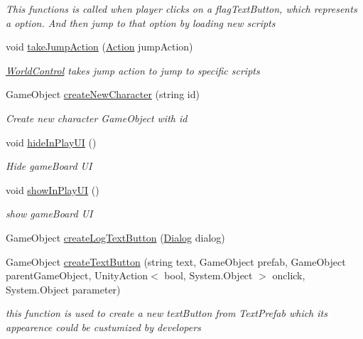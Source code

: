 \begin{DoxyCompactItemize}
\begin{DoxyCompactList}\small\item\em This functions is called when player clicks on a flag\+Text\+Button, which represents a option. And then jump to that option by loading new scripts \end{DoxyCompactList}\item 
void \hyperlink{classdoki_unity_1_1_world_control_aa103f4095742d045e60a608f6c2f7d67}{take\+Jump\+Action} (\hyperlink{classdoki_script_setting_1_1_action}{Action} jump\+Action)
\begin{DoxyCompactList}\small\item\em \hyperlink{classdoki_unity_1_1_world_control}{World\+Control} takes jump action to jump to specific scripts \end{DoxyCompactList}\item 
Game\+Object \hyperlink{classdoki_unity_1_1_world_control_a14311cb9ab401b556dd7f1c5b000b829}{create\+New\+Character} (string id)
\begin{DoxyCompactList}\small\item\em Create new character Game\+Object with id \end{DoxyCompactList}\item 
void \hyperlink{classdoki_unity_1_1_world_control_a4ceab05db8ef564ec44a7beef621e583}{hide\+In\+Play\+UI} ()
\begin{DoxyCompactList}\small\item\em Hide game\+Board UI \end{DoxyCompactList}\item 
void \hyperlink{classdoki_unity_1_1_world_control_ac519c4fe54a706bfdf67a61ceca1be99}{show\+In\+Play\+UI} ()
\begin{DoxyCompactList}\small\item\em show game\+Board UI \end{DoxyCompactList}\item 
Game\+Object \hyperlink{classdoki_unity_1_1_world_control_a5dfd7a49e2aa4559bdfef17e53020b33}{create\+Log\+Text\+Button} (\hyperlink{classdoki_unity_1_1_dialog}{Dialog} dialog)
\item 
Game\+Object \hyperlink{classdoki_unity_1_1_world_control_a3566b054b725be2b66811f4ad1daec26}{create\+Text\+Button} (string text, Game\+Object prefab, Game\+Object parent\+Game\+Object, Unity\+Action$<$ bool, System.\+Object $>$ onclick, System.\+Object parameter)
\begin{DoxyCompactList}\small\item\em this function is used to create a new text\+Button from Text\+Prefab which its appearence could be custumized by developers \end{DoxyCompactList}\item 

\end{DoxyCompactItemize}
